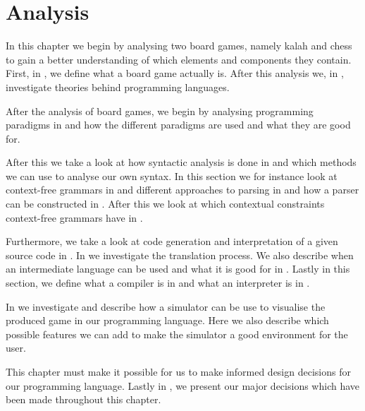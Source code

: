 \chapter{Analysis}
\label{chap:analysis}

In this chapter we begin by analysing two board games, namely kalah and chess to
gain a better understanding of which elements and components they contain.
First, in , we define what a board game actually
is. After this analysis we, in , investigate theories
behind programming languages. 

After the analysis of board games, we begin by analysing programming paradigms
in  and how the different paradigms are used and what they
are good for. 

After this we take a look at how syntactic analysis is done in
 and which methods we can use to analyse our own
syntax. In this section we for instance look at context-free grammars in
 and different approaches to parsing in
 and how a parser can be constructed in
. After this we look at which contextual
constraints context-free grammars have in .

Furthermore, we take a look at code generation and interpretation of a given
source code in . In
 we investigate the translation process. We also
describe when an intermediate language can be used and what it is good for in
. Lastly in this section, we define what a
compiler is in  and what an interpreter is in
.

In  we investigate and describe how a simulator can be use
to visualise the produced game in our programming language. Here we also
describe which possible features we can add to make the simulator a good
environment for the user.

This chapter must make it possible for us to make informed design decisions for
our programming language. Lastly in , we present
our major decisions which have been made throughout this chapter.









